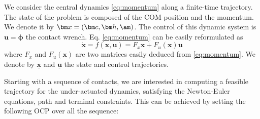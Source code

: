 We consider the central dynamics \eqref{eq:momentum} along a finite-time trajectory. The state of the problem is composed of the COM position and the momentum. We denote it by $\bm x = (\bm c,\bm h,\am)$. The control of this dynamic system is $\bm u = \bm\phi$ the contact wrench. Eq. \eqref{eq:momentum} can be easily reformulated as 
\begin{equation} \label{eq:dynbilin}
 \dot{\bm x} = f(\bm x,\bm u) = F_x \bm x + F_u(\bm x) \bm u 
\end{equation}
where $F_x$ and $F_u(\bm x)$ are two matrices easily deduced from \eqref{eq:momentum}. We denote by $\underline{\bm x}$ and $\underline{\bm u}$ the state and control trajectories.

Starting with a sequence of contacts, we are interested in computing a feasible trajectory for the under-actuated dynamics, satisfying the Newton-Euler equations, path and terminal constraints. This can be achieved by setting the following OCP over all the sequence:

